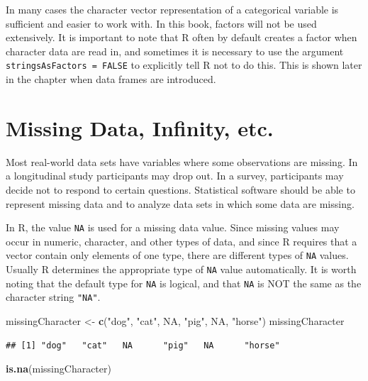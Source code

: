 \documentclass[
]{krantz}
\newenvironment{Shaded}{\begin{snugshade}}{\end{snugshade}}
\newcommand{\KeywordTok}[1]{\textcolor[rgb]{0.13,0.29,0.53}{\textbf{#1}}}
\newcommand{\NormalTok}[1]{#1}
\newcommand{\OtherTok}[1]{\textcolor[rgb]{0.56,0.35,0.01}{#1}}
\newcommand{\StringTok}[1]{\textcolor[rgb]{0.31,0.60,0.02}{#1}}
\begin{document}
In many cases the character vector representation of a categorical variable is sufficient and easier to work with. In this book, factors will not be used extensively. It is important to note that R often by default creates a factor when character data are read in, and sometimes it is necessary to use the argument \texttt{stringsAsFactors\ =\ FALSE} to explicitly tell R not to do this. This is shown later in the chapter when data frames are introduced.

\hypertarget{missing-data-infinity-etc.}{%
\section{Missing Data, Infinity, etc.}\label{missing-data-infinity-etc.}}

Most real-world data sets have variables where some observations are missing. In a longitudinal study participants may drop out. In a survey, participants may decide not to respond to certain questions. Statistical software should be able to represent missing data and to analyze data sets in which some data are missing.

In R, the value \texttt{NA} is used for a missing data value. Since missing values may occur in numeric, character, and other types of data, and since R requires that a vector contain only elements of one type, there are different types of \texttt{NA} values. Usually R determines the appropriate type of \texttt{NA} value automatically. It is worth noting that the default type for \texttt{NA} is logical, and that \texttt{NA} is NOT the same as the character string \texttt{"NA"}.

\begin{Shaded}
\begin{Highlighting}[]
\NormalTok{missingCharacter \textless{}{-}}\StringTok{ }\KeywordTok{c}\NormalTok{(}\StringTok{"dog"}\NormalTok{, }\StringTok{"cat"}\NormalTok{, }\OtherTok{NA}\NormalTok{, }\StringTok{"pig"}\NormalTok{, }\OtherTok{NA}\NormalTok{, }\StringTok{"horse"}\NormalTok{)}
\NormalTok{missingCharacter}
\end{Highlighting}
\end{Shaded}

\begin{verbatim}
## [1] "dog"   "cat"   NA      "pig"   NA      "horse"
\end{verbatim}

\begin{Shaded}
\begin{Highlighting}[]
\KeywordTok{is.na}\NormalTok{(missingCharacter)}
\end{Highlighting}
\end{Shaded}
\end{document}
